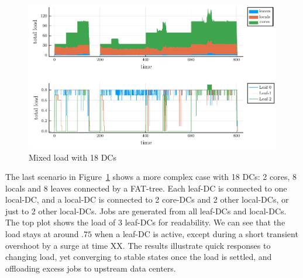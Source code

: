 


\begin{figure}[tb]
  \centering
  \includegraphics[width=\columnwidth]{18nodes.pdf}
  \vspace{-2.0ex}
  \caption{Mixed load with 18 DCs}
  \label{fig:18nodes}
\end{figure}

The last scenario in Figure~\ref{fig:18nodes} shows a more complex case with
18 DCs: 2 cores, 8 locals and 8 leaves connected by a FAT-tree.
Each leaf-DC is connected to one local-DC, and a local-DC is connected to
2 core-DCs and 2 other local-DCs, or just to 2 other local-DCs.
Jobs are generated from all leaf-DCs and local-DCs.
The top plot shows the load of 3 leaf-DCs for readability.
We can see that the load stays at around $.75$ when a leaf-DC is
active, except during a short transient overshoot by a surge at time XX.
The results illustrate quick responses to changing load,
yet converging to stable states once the load is settled,
and offloading excess jobs to upstream data centers.

